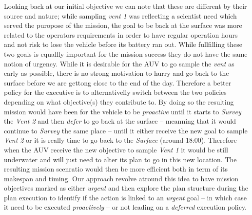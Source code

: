 Looking back at our initial objective we can note that these are
different by their source and nature; while 
sampling {\em vent 1} was reflecting a scientist need which served the
puropose of the mission, the goal to be back at the surface was more
related to the operators requirements in order to have regular
operation hours and not risk to lose the vehicle before its battery
ran out. While fullfilling these two goals is equallly important for
the mission success they do not have the same notion of urgency. While
it is desirable  for the AUV to go sample the {\em vent} as early as
possible, there is no strong motivation to hurry and go back to the
surface before we are gettong close to the end of the day. Therefore a
better policy for the executive is to alternativelly switch between
the two policies depending on what objective(s) they contribute to. By
doing so the resulting mission would have been for the vehicle to be
{\em proactive} until it starts to {\em Survey} the {\em Vent 2} and
then {\em defer} to go back at the surface -- meanning that it would
continue to {\em Survey} the same place -- until it either receive the
new goal to sample {\em Vent 2} or it is really time to go back to the
{\em Surface} (around 18:00). Therefore when the AUV receive the new
objective to sample {\em Vent 1} it would be still underwater and will
just need to alter its plan to go in this new location. The resulting
mission scenratio would then be more efficient both in term of its
makespan and timing. Our approach revolve atround this idea to have
mission objectives marked as either {\em urgent} and then explore the
plan structure during the plan execution to identify if the action is
linked to an {\em urgent} goal -- in which case it need to be executed
{\em proactively} -- or not leading on a {\em deferred} execution policy.
 


